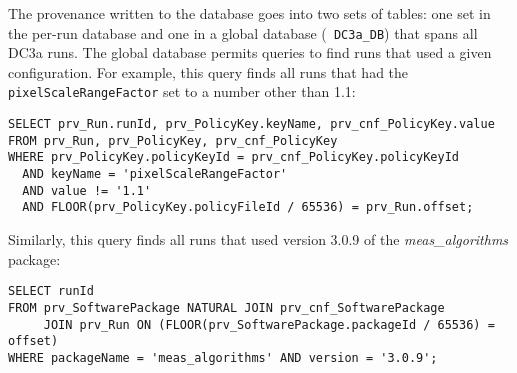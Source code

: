 The provenance written to the database goes into two sets of tables: one
set in the per-run database and one in a global database ({\tt
DC3a\_DB}) that spans all DC3a runs.  The global database permits
queries to find runs that used a given configuration.  For example, this
query finds all runs that had the {\tt pixelScaleRangeFactor} set to a
number other than 1.1:

\begin{verbatim}
SELECT prv_Run.runId, prv_PolicyKey.keyName, prv_cnf_PolicyKey.value
FROM prv_Run, prv_PolicyKey, prv_cnf_PolicyKey
WHERE prv_PolicyKey.policyKeyId = prv_cnf_PolicyKey.policyKeyId
  AND keyName = 'pixelScaleRangeFactor'
  AND value != '1.1'
  AND FLOOR(prv_PolicyKey.policyFileId / 65536) = prv_Run.offset;
\end{verbatim}

Similarly, this query finds all runs that used version 3.0.9 of the {\it
meas\_algorithms} package:

\begin{verbatim}
SELECT runId
FROM prv_SoftwarePackage NATURAL JOIN prv_cnf_SoftwarePackage
     JOIN prv_Run ON (FLOOR(prv_SoftwarePackage.packageId / 65536) = offset)
WHERE packageName = 'meas_algorithms' AND version = '3.0.9';
\end{verbatim}

